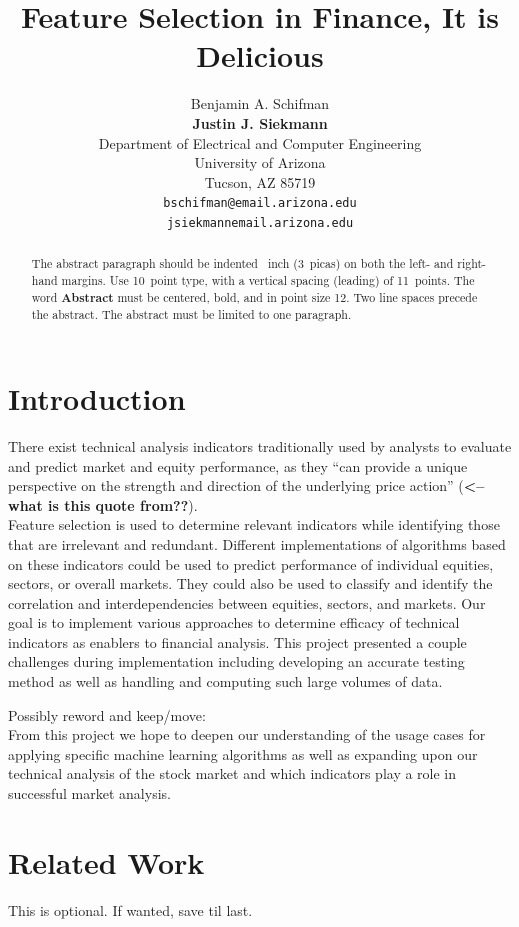\documentclass{article}
\title{Feature Selection in Finance, It is Delicious}
\author{
  Benjamin A. Schifman\\
  \textbf{Justin J. Siekmann}\\
  Department of Electrical and Computer Engineering\\
  University of Arizona\\
  Tucson, AZ 85719 \\
  \texttt{bschifman@email.arizona.edu} \\
  \texttt{jsiekmannemail.arizona.edu}
}
\begin{document}
 

\maketitle

\begin{abstract}
	\color{red}
  The abstract paragraph should be indented ~inch
  (3~picas) on both the left- and right-hand margins. Use 10~point
  type, with a vertical spacing (leading) of 11~points.  The word
  \textbf{Abstract} must be centered, bold, and in point size 12. Two
  line spaces precede the abstract. The abstract must be limited to
  one paragraph.
\end{abstract}

\section{\color{red}Introduction}
There exist technical analysis indicators traditionally used by analysts to evaluate and predict market and equity performance, as they “can provide a unique perspective on the strength and direction of the underlying price action” ({\bf <--what is this quote from??}). \\
Feature selection is used to determine relevant indicators while identifying those that are irrelevant and redundant. Different implementations of algorithms based on these indicators could be used to predict performance of individual equities, sectors, or overall markets. They could also be used to classify and identify the correlation and interdependencies between equities, sectors, and markets. Our goal is to implement various approaches to determine efficacy of technical indicators as enablers to financial analysis. This project presented a couple challenges during implementation including developing an accurate testing method as well as handling and computing such large volumes of data.

Possibly reword and keep/move:\\
From this project we hope to deepen our understanding of the usage cases for applying specific machine learning algorithms as well as expanding upon our technical analysis of the stock market and which indicators play a role in successful market analysis.

\section{Related Work}
This is optional. If wanted, save til last.
\end{document}
